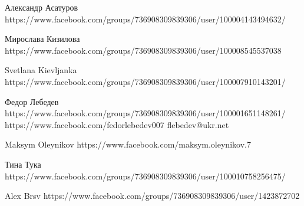  
 
 
 
 

Александр Асатуров
https://www.facebook.com/groups/736908309839306/user/100004143494632/

Мирослава Кизилова
https://www.facebook.com/groups/736908309839306/user/100008545537038

Svetlana Kievljanka
https://www.facebook.com/groups/736908309839306/user/100007910143201/

Федор Лебедев
https://www.facebook.com/groups/736908309839306/user/100001651148261/
https://www.facebook.com/fedorlebedev007
flebedev@ukr.net

Maksym Oleynikov
https://www.facebook.com/maksym.oleynikov.7

Тина Тука
https://www.facebook.com/groups/736908309839306/user/100010758256475/

Alex Brsv
https://www.facebook.com/groups/736908309839306/user/1423872702
